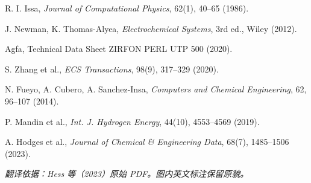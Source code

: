 \documentclass[UTF8,zihao=-4,fontset=fandol]{ctexart}
\begin{document}
\begin{enumerate}[label={[\arabic*]},leftmargin=2.7em,itemsep=0.2em]
\item R. I. Issa, \emph{Journal of Computational Physics}, 62(1), 40--65 (1986).
\item J. Newman, K. Thomas-Alyea, \emph{Electrochemical Systems}, 3rd ed., Wiley (2012).
\item Agfa, Technical Data Sheet ZIRFON PERL UTP 500 (2020).
\item S. Zhang et al., \emph{ECS Transactions}, 98(9), 317--329 (2020).
\item N. Fueyo, A. Cubero, A. Sanchez-Insa, \emph{Computers and Chemical Engineering}, 62, 96--107 (2014).
\item P. Mandin et al., \emph{Int. J. Hydrogen Energy}, 44(10), 4553--4569 (2019).
\item A. Hodges et al., \emph{Journal of Chemical \& Engineering Data}, 68(7), 1485--1506 (2023).
\end{enumerate}

\vfill
\begin{center}\small\itshape
翻译依据：Hess 等（2023）原始 PDF。图内英文标注保留原貌。
\end{center}
\end{document}
